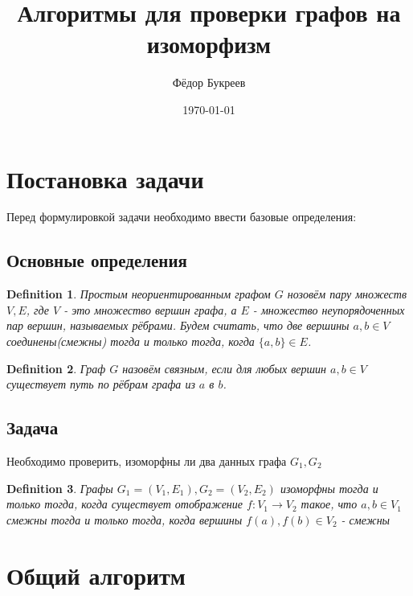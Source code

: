 \documentclass[fleqn]{article}
\title{Алгоритмы для проверки графов на изоморфизм}
\author{Фёдор Букреев}
\date{\today}
\newtheorem{definition}{Definition}
\begin{document}
\maketitle
\tableofcontents

\section{Постановка задачи}
Перед формулировкой задачи необходимо ввести базовые определения:
\subsection{Основные определения}
\begin{definition}
    Простым неориентированным графом $G$ нозовём пару множеств $V, E$, где $V$ - это множество вершин графа, а $E$ - множество неупорядоченных пар вершин, называемых рёбрами. Будем считать, что две вершины $a, b \in V$ соединены(смежны) тогда и только тогда, когда $\{a, b\} \in E$.
\end{definition}
\begin{definition}
    Граф $G$ назовём связным, если для любых вершин $a, b \in V$ существует путь по рёбрам графа из $a$ в $b$.
\end{definition}
\subsection{Задача}
Необходимо проверить, изоморфны ли два данных графа $G_1, G_2$
\begin{definition}
    Графы $G_1=(V_1, E_1), G_2=(V_2, E_2)$ изоморфны тогда и только тогда, когда существует отображение $f: V_1 \rightarrow V_2$ такое, что $a, b \in V_1$ смежны тогда и только тогда, когда вершины $f(a), f(b) \in V_2$ - смежны
\end{definition}



\section{Общий алгоритм}


\end{document}
